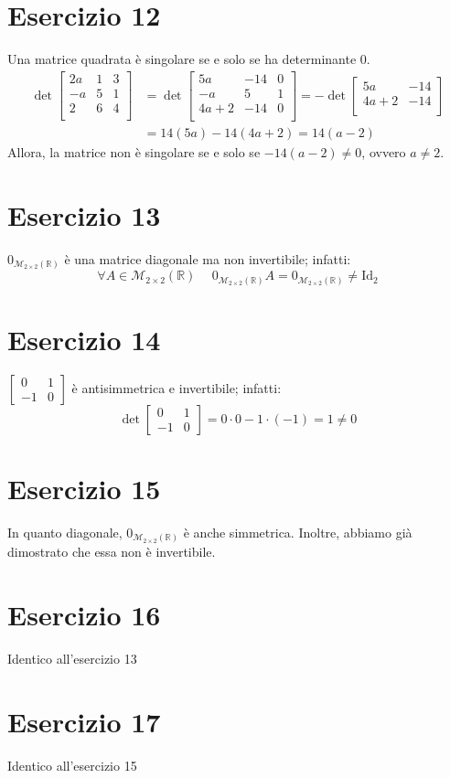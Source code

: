 \documentclass{article}
\newcommand*{\M}[3]{\mathcal{M}_{#1\times#2} \left(#3\right)}
\newcommand*{\MR}[2]{\M{#1}{#2}{\mathbb{R}}}
\newcommand*{\m}[1]{\begin{bmatrix}#1\end{bmatrix}}
\begin{document}
\section*{Esercizio 12}
Una matrice quadrata è singolare se e solo se ha determinante $0$.
\[\begin{aligned}
    \det\m{
        2a & 1 & 3 \\
        -a & 5 & 1 \\
        2 & 6 & 4 \\
    } &= \det\m{
        5a & -14 & 0 \\
        -a & 5 & 1 \\
        4a+2 & -14 & 0 \\
    } = -\det\m{
        5a & -14 \\
        4a+2 & -14 \\
    } \\ &= 14(5a) - 14(4a+2) = 14(a-2)
\end{aligned}\]
Allora, la matrice non è singolare se e solo se $-14(a-2) \ne 0$, ovvero $a \ne 2$.

\section*{Esercizio 13}
$0_{\MR{2}{2}}$ è una matrice diagonale ma non invertibile; infatti:
\[\forall A\in\MR{2}{2}\hspace{15pt}0_{\MR{2}{2}}A=0_{\MR{2}{2}}\ne\text{Id}_2\]

\section*{Esercizio 14}
$\m{ 0 & 1 \\ -1 & 0 }$ è antisimmetrica e invertibile; infatti:
\[
    \det\m{ 0 & 1 \\ -1 & 0 } =
    0\cdot0 - 1\cdot(-1) = 1 \ne 0
\]

\section*{Esercizio 15}
In quanto diagonale, $0_{\MR{2}{2}}$ è anche simmetrica.
Inoltre, abbiamo già dimostrato che essa non è invertibile.

\section*{Esercizio 16}
Identico all'esercizio 13

\section*{Esercizio 17}
Identico all'esercizio 15
\end{document}
